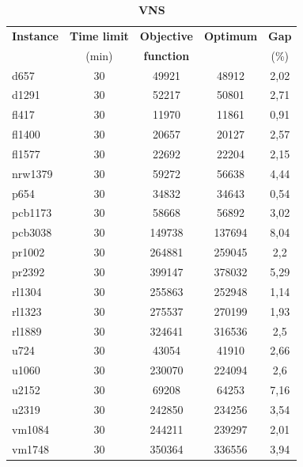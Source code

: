 \begin{table}[h!]
	\begin{center}
		\caption{\textbf{\large VNS}}
		\begin{tabular}{l|c|c|c|c}
			\textbf{Instance} & \textbf{Time limit} & \textbf{Objective} & \textbf{Optimum} & \textbf{ Gap } \\
			& (min) & \textbf{function} & & (\%)\\
			\hline
			d657 & 30 & 49921 & 48912 & 2,02 \\
			d1291 & 30 & 52217 & 50801 & 2,71  \\
			fl417 & 30 & 11970 & 11861 & 0,91\\
			fl1400 & 30 & 20657 & 20127 &  2,57 \\
			fl1577 & 30 & 22692 & 22204 &  2,15\\
			nrw1379 & 30 & 59272 & 56638 & 4,44 \\
			p654 & 30 & 34832 & 34643 & 0,54 \\
			pcb1173 & 30 & 58668 & 56892 & 3,02  \\
			pcb3038 & 30 & 149738 & 137694 & 8,04  \\
			pr1002 & 30 & 264881 & 259045 & 2,2  \\
			pr2392 & 30 & 399147 & 378032 & 5,29 \\
			rl1304 & 30 & 255863 & 252948 & 1,14  \\
			rl1323 & 30  & 275537 & 270199 &  1,93 \\
			rl1889 & 30 & 324641 & 316536 & 2,5 \\
			u724 & 30 & 43054 & 41910 & 2,66 \\
			u1060 & 30 & 230070 & 224094 & 2,6  \\
			u2152 & 30 & 69208 & 64253 & 7,16 \\
			u2319 & 30 & 242850 & 234256 & 3,54 \\
			vm1084 & 30 & 244211 & 239297 & 2,01  \\
			vm1748 & 30 & 350364 & 336556 & 3,94 \\
		\end{tabular}
	\end{center}
\end{table}

